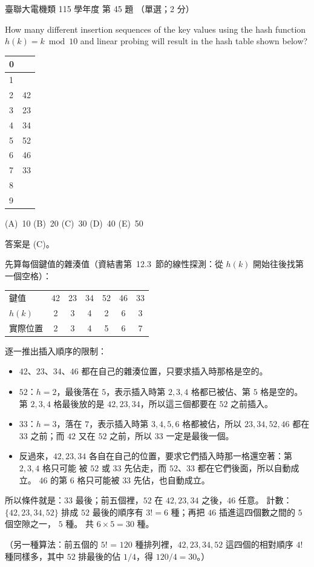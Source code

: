 \begin{pastexam}[label={px:ust-115-ee-ds-45}]{臺聯大電機類 115 學年度 第 45 題}
（單選；2 分）

How many different insertion sequences of the key values using the hash function
$h(k) = k \bmod 10$ and linear probing will result in the hash table shown below?

\begin{center}
\begin{tabular}{|p{2.5em}|p{2.5em}|}\hline
0 & \\\hline
1 & \\\hline
2 & 42\\\hline
3 & 23\\\hline
4 & 34\\\hline
5 & 52\\\hline
6 & 46\\\hline
7 & 33\\\hline
8 & \\\hline
9 & \\\hline
\end{tabular}
\end{center}

(A)~10 \qquad (B)~20 \qquad (C)~30 \qquad (D)~40 \qquad (E)~50
\end{pastexam}

\begin{pastsoln}
答案是 (C)。

先算每個鍵值的雜湊值（資結書第~12.3~節的線性探測：從 $h(k)$ 開始往後找第一個空格）：
\begin{center}
\begin{tabular}{lcccccc}
\toprule
鍵值 & 42 & 23 & 34 & 52 & 46 & 33 \\
$h(k)$ & 2 & 3 & 4 & 2 & 6 & 3 \\
實際位置 & 2 & 3 & 4 & 5 & 6 & 7 \\
\bottomrule
\end{tabular}
\end{center}
逐一推出插入順序的限制：
\begin{itemize}
\item $42$、$23$、$34$、$46$ 都在自己的雜湊位置，只要求插入時那格是空的。
\item $52$：$h = 2$，最後落在 $5$，表示插入時第 $2, 3, 4$ 格都已被佔、第 $5$ 格是空的。 第 $2, 3, 4$
格最後放的是 $42, 23, 34$，所以這三個都要在 $52$ 之前插入。
\item $33$：$h = 3$，落在 $7$，表示插入時第 $3, 4, 5, 6$ 格都被佔，所以 $23, 34, 52, 46$ 都在 $33$
之前；而 $42$ 又在 $52$ 之前，所以 $33$ 一定是最後一個。
\item 反過來，$42, 23, 34$ 各自在自己的位置，要求它們插入時那一格還空著：第 $2, 3, 4$ 格只可能
被 $52$ 或 $33$ 先佔走，而 $52$、$33$ 都在它們後面，所以自動成立。 $46$ 的第 $6$ 格只可能被 $33$
先佔，也自動成立。
\end{itemize}
所以條件就是：$33$ 最後；前五個裡，$52$ 在 $42, 23, 34$ 之後，$46$ 任意。 計數：
$\{42, 23, 34, 52\}$ 排成 $52$ 最後的順序有 $3! = 6$ 種；再把 $46$ 插進這四個數之間的 $5$ 個空隙之一，
$5$ 種。 共 $6 \times 5 = 30$ 種。

（另一種算法：前五個的 $5!$ = $120$ 種排列裡，$42, 23, 34, 52$ 這四個的相對順序 $4!$ 種同樣多，其中
$52$ 排最後的佔 $1/4$，得 $120/4 = 30$。）
\end{pastsoln}
